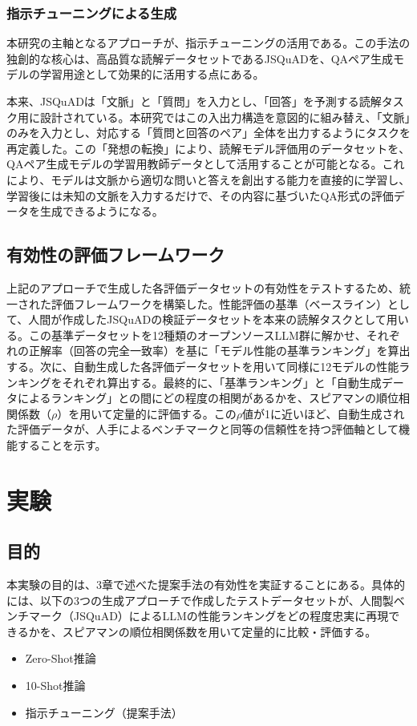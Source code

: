 \documentclass[a4paper,11pt]{jreport}
\begin{document}
\subsection{指示チューニングによる生成}
本研究の主軸となるアプローチが、指示チューニング\cite{Instruction-Tuning}の活用である。この手法の独創的な核心は、高品質な読解データセットであるJSQuAD\cite{JSQuAD}を、QAペア生成モデルの学習用途として効果的に活用する点にある。

本来、JSQuADは「文脈」と「質問」を入力とし、「回答」を予測する読解タスク用に設計されている。本研究ではこの入出力構造を意図的に組み替え、「文脈」のみを入力とし、対応する「質問と回答のペア」全体を出力するようにタスクを再定義した。この「発想の転換」により、読解モデル評価用のデータセットを、QAペア生成モデルの学習用教師データとして活用することが可能となる。これにより、モデルは文脈から適切な問いと答えを創出する能力を直接的に学習し、学習後には未知の文脈を入力するだけで、その内容に基づいたQA形式の評価データを生成できるようになる。

\section{有効性の評価フレームワーク}
上記のアプローチで生成した各評価データセットの有効性をテストするため、統一された評価フレームワークを構築した。性能評価の基準（ベースライン）として、人間が作成したJSQuADの検証データセットを本来の読解タスクとして用いる。この基準データセットを12種類のオープンソースLLM群に解かせ、それぞれの正解率（回答の完全一致率）を基に「モデル性能の基準ランキング」を算出する。次に、自動生成した各評価データセットを用いて同様に12モデルの性能ランキングをそれぞれ算出する。最終的に、「基準ランキング」と「自動生成データによるランキング」との間にどの程度の相関があるかを、スピアマンの順位相関係数（$\rho$）を用いて定量的に評価する。この$\rho$値が1に近いほど、自動生成された評価データが、人手によるベンチマークと同等の信頼性を持つ評価軸として機能することを示す。

\chapter{実験}

\section{目的}
本実験の目的は、3章で述べた提案手法の有効性を実証することにある。具体的には、以下の3つの生成アプローチで作成したテストデータセットが、人間製ベンチマーク（JSQuAD）によるLLMの性能ランキングをどの程度忠実に再現できるかを、スピアマンの順位相関係数を用いて定量的に比較・評価する。
\begin{itemize}
    \item Zero-Shot推論
    \item 10-Shot推論
    \item 指示チューニング（提案手法）
\end{itemize}
\end{document}
